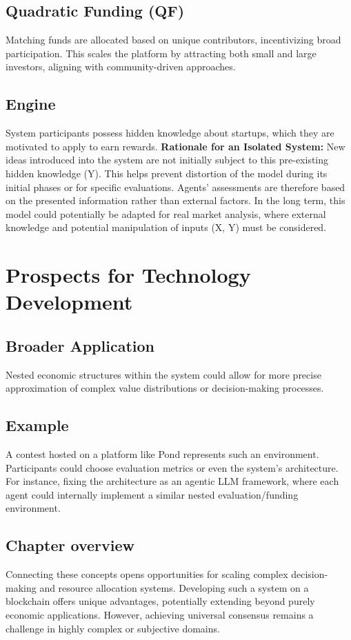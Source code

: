 \documentclass[12pt]{article}
\begin{document}
\subsection{Quadratic Funding (QF)}
Matching funds are allocated based on unique contributors, incentivizing broad participation. This scales the platform by attracting both small and large investors, aligning with community-driven approaches.

\subsection{Engine}
System participants possess hidden knowledge about startups, which they are motivated to apply to earn rewards.
\textbf{Rationale for an Isolated System:} New ideas introduced into the system are not initially subject to this pre-existing hidden knowledge (Y). This helps prevent distortion of the model during its initial phases or for specific evaluations. Agents' assessments are therefore based on the presented information rather than external factors.
In the long term, this model could potentially be adapted for real market analysis, where external knowledge and potential manipulation of inputs (X, Y) must be considered.

%
\section{Prospects for Technology Development}

\subsection{Broader Application}
Nested economic structures within the system could allow for more precise approximation of complex value distributions or decision-making processes.

\subsection{Example}
A contest hosted on a platform like Pond represents such an environment. Participants could choose evaluation metrics or even the system's architecture. For instance, fixing the architecture as an agentic LLM framework, where each agent could internally implement a similar nested evaluation/funding environment.

\subsection{Chapter overview}
Connecting these concepts opens opportunities for scaling complex decision-making and resource allocation systems. Developing such a system on a blockchain offers unique advantages, potentially extending beyond purely economic applications. However, achieving universal consensus remains a challenge in highly complex or subjective domains.
\end{document}
